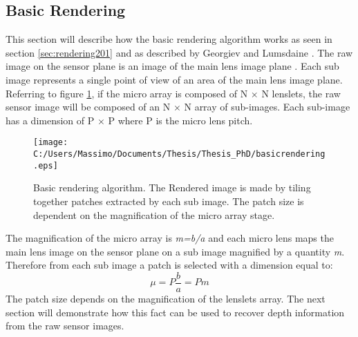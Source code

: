 \subsection{Basic Rendering}
\label{sec:basicrendering}
This section will describe how the basic rendering algorithm works as seen in section \ref{sec:rendering201} and as described by Georgiev and Lumsdaine  \cite{georgiev2010focused,lumsdaine2009focused}.
The raw image on the sensor plane is an image of the main lens image plane \cite{georgiev2010focused}. Each sub image represents a single point of view of an area of the main lens image plane. Referring to figure \ref{fig:render20b}, if the micro array is composed of N $\times$ N lenslets, the raw sensor image will be composed of an N $\times$ N array of sub-images. Each sub-image has a dimension of P $\times$ P where P is the micro lens pitch. 
\begin{figure}[H]
	\centering
	\texttt{[image: C:/Users/Massimo/Documents/Thesis/Thesis\_PhD/basicrendering.eps]}
	\caption{\label{fig:render20b} Basic rendering algorithm. The Rendered image is made by tiling together patches extracted by each sub image. The patch size is dependent on the magnification of the micro array stage.  }
\end{figure}
The magnification of the micro array is \textit{m=b/a} and each micro lens maps the main lens image on the sensor plane on a sub image magnified by a quantity \textit{m}. Therefore from each sub image a patch is selected with a dimension equal to:
\begin{equation}
	\label{eq:patch}
	\mu = P \dfrac{b}{a} = P m
\end{equation}
The patch size depends on the magnification of the lenslets array. The next section will demonstrate how this fact can be used to recover depth information from the raw sensor images. 
